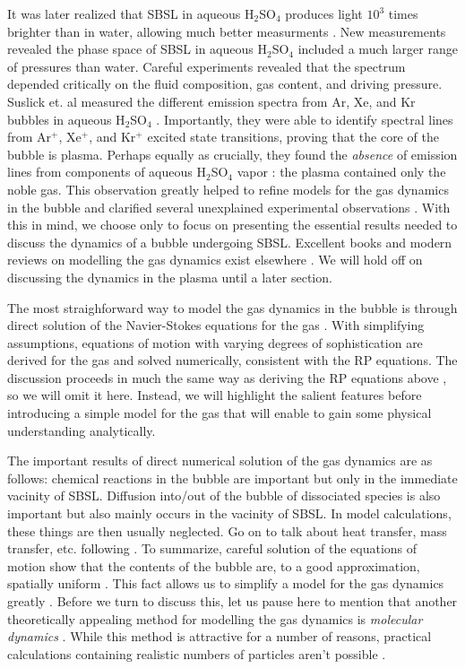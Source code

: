 \documentclass[rmp,aps,nofootinbib,superscriptaddress,floatfix,10pt]{revtex4-2}
\begin{document}
It was later realized that SBSL in aqueous H$_2$SO$_4$ produces light $10^3$ times brighter than in water, allowing much better measurments \cite{}. New measurements revealed the phase space of SBSL in aqueous H$_2$SO$_4$ included a much larger range of pressures than water. Careful experiments revealed that the spectrum depended critically on the fluid composition, gas content, and driving pressure. Suslick et. al measured the different emission spectra from Ar, Xe, and Kr bubbles in aqueous H$_2$SO$_4$ \cite{flannigan2005plasma,flannigan2006measurement,suslick2008inside}. Importantly, they were able to identify spectral lines from Ar$^+$, Xe$^+$, and Kr$^+$ excited state transitions, proving that the core of the bubble is plasma. Perhaps equally as crucially, they found the \emph{absence} of emission lines from components of aqueous H$_2$SO$_4$ vapor \cite{suslick2008inside,flannigan2006measurement,flannigan2006measurement}: the plasma contained only the noble gas. This observation greatly helped to refine models for the gas dynamics in the bubble and clarified several unexplained experimental observations \cite{}. With this in mind, we choose only to focus on presenting the essential results needed to discuss the dynamics of a bubble undergoing SBSL. Excellent books and modern reviews on modelling the gas dynamics exist elsewhere \cite{brenner2002single,yasui2018acoustic,brennen2014cavitation}. We will hold off on discussing the dynamics in the plasma until a later section. 

The most straighforward way to model the gas dynamics in the bubble is through direct solution of the Navier-Stokes equations for the gas \cite{brenner2002single}. With simplifying assumptions, equations of motion with varying degrees of sophistication are derived for the gas and solved numerically, consistent with the RP equations. The discussion proceeds in much the same way as deriving the RP equations above \cite{}, so we will omit it here. Instead, we will highlight the salient features before introducing a simple model for the gas that will enable to gain some physical understanding analytically.

The important results of direct numerical solution of the gas dynamics are as follows: chemical reactions in the bubble are important but only in the immediate vacinity of SBSL. Diffusion into/out of the bubble of dissociated species is also important but also mainly occurs in the vacinity of SBSL. In model calculations, these things are then usually neglected. {\color{red} Go on to talk about heat transfer, mass transfer, etc. following \cite{brenner2002single}. } To summarize, careful solution of the equations of motion show that the contents of the bubble are, to a good approximation, spatially uniform \cite{}. This fact allows us to simplify a model for the gas dynamics greatly \cite{}. Before we turn to discuss this, let us pause here to mention that another theoretically appealing method for modelling the gas dynamics is \emph{molecular dynamics} \cite{}. While this method is attractive for a number of reasons, practical calculations containing realistic numbers of particles aren't possible \cite{brenner2002single}.
\end{document}
